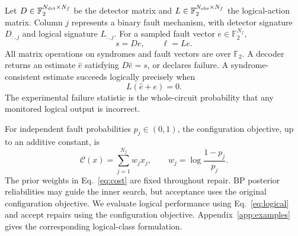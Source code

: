 \documentclass[10pt,letterpaper,twocolumn]{article}
\newcommand{\F}{\mathbb F_2}
\newcommand{\cost}{\mathcal C}
\begin{document}
Let $D\in\F^{N_{\rm det}\times N_f}$ be the detector matrix and $L\in\F^{N_{\rm obs}\times N_f}$ the logical-action matrix. Column $j$ represents a binary fault mechanism, with detector signature $D_{:,j}$ and logical signature $L_{:,j}$. For a sampled fault vector $e\in\F^{N_f}$,
\begin{equation}s=De,\qquad \ell=Le.\label{eq:model}\end{equation}
All matrix operations on syndromes and fault vectors are over $\F$. A decoder returns an estimate $\hat e$ satisfying $D\hat e=s$, or declares failure. A syndrome-consistent estimate succeeds logically precisely when
\begin{equation}L(\hat e+e)=0.\label{eq:logical}\end{equation}
The experimental failure statistic is the whole-circuit probability that any monitored logical output is incorrect.

For independent fault probabilities $p_j\in(0,1)$, the configuration objective, up to an additive constant, is
\begin{equation}\cost(x)=\sum_{j=1}^{N_f}w_jx_j,\qquad w_j=\log\frac{1-p_j}{p_j}.\label{eq:cost}\end{equation}
The prior weights in Eq.~\eqref{eq:cost} are fixed throughout repair. BP posterior reliabilities may guide the inner search, but acceptance uses the original configuration objective. We evaluate logical performance using Eq.~\eqref{eq:logical} and accept repairs using the configuration objective. Appendix~\ref{app:examples} gives the corresponding logical-class formulation.
\end{document}
